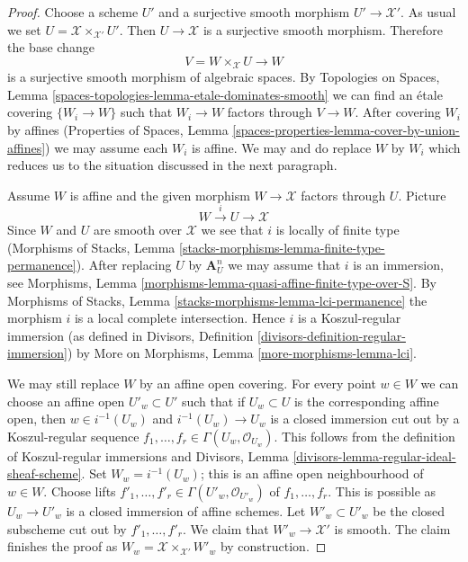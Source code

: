 \documentclass[10pt,a4paper]{amsart}
\theoremstyle{plain}
\theoremstyle{definition}
\theoremstyle{remark}
\numberwithin{equation}{subsection}
\begin{document}
\begin{proof}
Choose a scheme $U'$ and a surjective smooth morphism $U' \to \mathcal{X}'$.
As usual we set $U = \mathcal{X} \times_{\mathcal{X}'} U'$. Then
$U \to \mathcal{X}$ is a surjective smooth morphism. Therefore the base change
$$
V = W \times_{\mathcal{X}} U \longrightarrow W
$$
is a surjective smooth morphism of algebraic spaces.
By Topologies on Spaces, Lemma
\ref{spaces-topologies-lemma-etale-dominates-smooth}
we can find an \'etale covering $\{W_i \to W\}$ such
that $W_i \to W$ factors through $V \to W$.
After covering $W_i$ by affines (Properties of Spaces, Lemma
\ref{spaces-properties-lemma-cover-by-union-affines})
we may assume each $W_i$ is affine. We may and do replace $W$ by $W_i$
which reduces us to the situation discussed in the next paragraph.

\medskip\noindent
Assume $W$ is affine and the given morphism $W \to \mathcal{X}$ factors
through $U$. Picture
$$
W \xrightarrow{i} U \to \mathcal{X}
$$
Since $W$ and $U$ are smooth over $\mathcal{X}$ we see that
$i$ is locally of finite type (Morphisms of Stacks, Lemma
\ref{stacks-morphisms-lemma-finite-type-permanence}).
After replacing $U$ by $\mathbf{A}^n_U$ we may assume
that $i$ is an immersion, see
Morphisms, Lemma \ref{morphisms-lemma-quasi-affine-finite-type-over-S}.
By Morphisms of Stacks,
Lemma \ref{stacks-morphisms-lemma-lci-permanence}
the morphism $i$ is a local complete intersection.
Hence $i$ is a Koszul-regular immersion (as defined in
Divisors, Definition \ref{divisors-definition-regular-immersion})
by More on Morphisms, Lemma \ref{more-morphisms-lemma-lci}.

\medskip\noindent
We may still replace $W$ by an affine open covering.
For every point $w \in W$ we can choose an affine open
$U'_w \subset U'$ such that if $U_w \subset U$ is the
corresponding affine open, then $w \in i^{-1}(U_w)$ and
$i^{-1}(U_w) \to U_w$ is a closed immersion cut out
by a Koszul-regular sequence
$f_1, \ldots, f_r \in \Gamma(U_w, \mathcal{O}_{U_w})$.
This follows from the definition of Koszul-regular immersions
and Divisors, Lemma \ref{divisors-lemma-regular-ideal-sheaf-scheme}.
Set $W_w = i^{-1}(U_w)$; this is an affine open neighbourhood
of $w \in W$.
Choose lifts $f'_1, \ldots, f'_r \in \Gamma(U'_w, \mathcal{O}_{U'_w})$
of $f_1, \ldots, f_r$. This is possible as $U_w \to U'_w$
is a closed immersion of affine schemes.
Let $W'_w \subset U'_w$ be the closed subscheme cut out by
$f'_1, \ldots, f'_r$.
We claim that $W'_w \to \mathcal{X}'$ is smooth.
The claim finishes the proof as
$W_w = \mathcal{X} \times_{\mathcal{X}'} W'_w$
by construction.


\end{proof}
\end{document}
